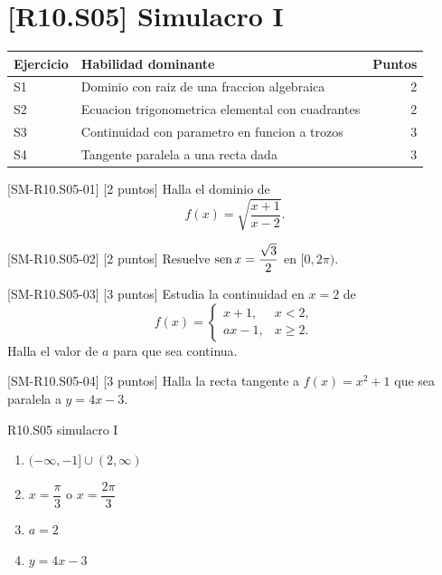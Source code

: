 \section{[R10.S05] Simulacro I}

\begin{tcolorbox}[basebox,title={Baremo orientativo del simulacro I}]
\begin{tabularx}{\textwidth}{l X r}
\toprule
Ejercicio & Habilidad dominante & Puntos \\
\midrule
S1 & Dominio con raiz de una fraccion algebraica & 2 \\
S2 & Ecuacion trigonometrica elemental con cuadrantes & 2 \\
S3 & Continuidad con parametro en funcion a trozos & 3 \\
S4 & Tangente paralela a una recta dada & 3 \\
\bottomrule
\end{tabularx}
\end{tcolorbox}

\begin{exercise}{[SM-R10.S05-01] [2 puntos] Halla el dominio de
\[
f(x)=\sqrt{\frac{x+1}{x-2}}.
\]}
\end{exercise}

\begin{exercise}{[SM-R10.S05-02] [2 puntos] Resuelve \(\operatorname{sen} x=\dfrac{\sqrt{3}}{2}\) en
\([0,2\pi)\).}
\end{exercise}

\begin{exercise}{[SM-R10.S05-03] [3 puntos] Estudia la continuidad en \(x=2\) de
\[
f(x)=
\begin{cases}
x+1, & x<2,\\
ax-1, & x\geq 2.
\end{cases}
\]
Halla el valor de \(a\) para que sea continua.}
\end{exercise}

\begin{exercise}{[SM-R10.S05-04] [3 puntos] Halla la recta tangente a \(f(x)=x^2+1\) que sea
paralela a \(y=4x-3\).}
\end{exercise}

\begin{shortanswer}{R10.S05 simulacro I}
\begin{enumerate}[label=\textbf{SM-R10.S05-\arabic*:}, leftmargin=*]
  \item \((-\infty,-1]\cup(2,\infty)\)
  \item \(x=\dfrac{\pi}{3}\) o \(x=\dfrac{2\pi}{3}\)
  \item \(a=2\)
  \item \(y=4x-3\)
\end{enumerate}
\end{shortanswer}

